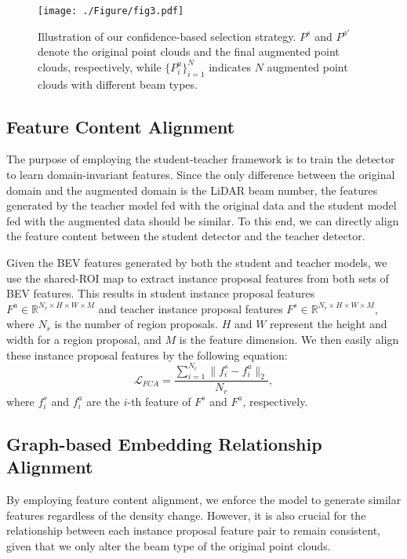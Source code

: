 \begin{figure}[t!]
\centering
\texttt{[image: ./Figure/fig3.pdf]}
\caption{Illustration of our confidence-based selection strategy. $P^{s}$ and $P^{a'}$ denote the original point clouds and the final augmented point clouds, respectively, while $\{P^{a}_{i}\}_{i=1}^{N}$ indicates $N$ augmented point clouds with different beam types.}

\vspace{-.5cm}
\label{fig3}
\end{figure}

\subsection{Feature Content Alignment}
The purpose of employing the student-teacher framework is to train the detector to learn domain-invariant features. Since the only difference between the original domain and the augmented domain is the LiDAR beam number, the features generated by the teacher model fed with the original data and the student model fed with the augmented data should be similar. To this end, we can directly align the feature content between the student detector and the teacher detector.

Given the BEV features generated by both the student and teacher models, we use the shared-ROI map to extract instance proposal features from both sets of BEV features. This results in student instance proposal features $F^{a} \in \mathbb{R}^{N_{r} \times H \times W \times M}$ and teacher instance proposal features $F^{s} \in \mathbb{R}^{N_{r} \times H \times W \times M}$, where $N_{r}$ is the number of region proposals. $H$ and $W$ represent the height and width for a region proposal, and $M$ is the feature dimension. We then easily align these instance proposal features by the following equation:
\begin{equation}
    \mathcal{L}_{FCA} = \frac{\sum_{i=1}^{N_{r}}{\|f^{s}_{i} - f^{a}_{i}\|_{2}}}{N_{r}},
\end{equation}
where $f^{s}_{i}$ and $f^{a}_{i}$ are the $i$-th feature of $F^{s}$ and $F^{a}$, respectively.

\subsection{Graph-based Embedding Relationship Alignment}
By employing feature content alignment, we enforce the model to generate similar features regardless of the density change. However, it is also crucial for the relationship between each instance proposal feature pair to remain consistent, given that we only alter the beam type of the original point clouds.

